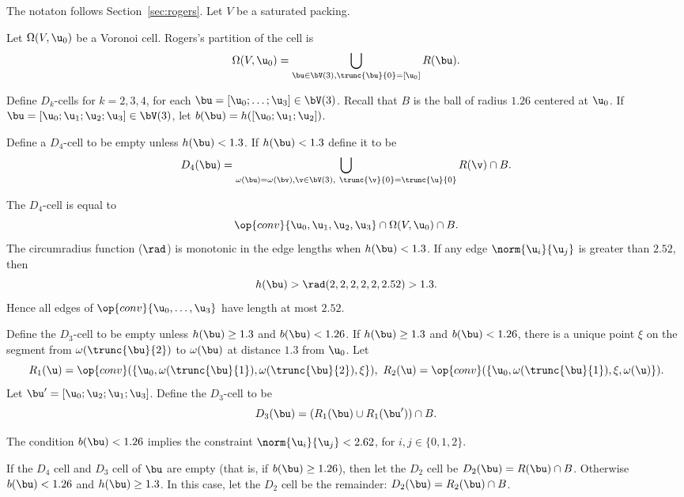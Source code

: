 The notaton follows Section~\ref{sec:rogers}.  Let $V$ be a saturated
packing.

Let $\Omega( V,\u_0)$ be a Voronoi cell.  Rogers's partition of the cell
is
\[
\Omega(V, \u_0) = \bigcup_{ \bu\in  \bV(3), \trunc{\bu}{0}= [\u_0] } R( \bu).
\]
%
%


Define $D_k$-cells for $k=2,3,4$, for each $ \bu=[\u_0;\ldots;\u_3]\in
\bV(3)$.  Recall that $B$ is the ball of radius $1.26$ centered at $
\u_0$.  If $\bu =[\u_0;\u_1;\u_2;\u_3]\in \bV(3)$, let $b(\bu) = h([
\u_0; \u_1; \u_2])$.  %
%

\begin{definition}[$D_4$]
  Define a $D_4$-cell to be empty unless $h(\bu)<1.3$.  If
  $h(\bu)<1.3$ define it to be
\[
  D_4(\bu)=\bigcup_{\omega( \bu)
=\omega(\bv),  \v\in  \bV(3),\ \trunc{\v}{0}= \trunc{\u}{0}}  R(\v)\cap B.
\]
%
\end{definition}

The $D_4$-cell is equal to
\[
  \op{conv}\{ \u_0, \u_1, \u_2, \u_3\} \cap \Omega(V, \u_0)\cap B.
\]
The circumradius function ($\rad$) is monotonic in the edge lengths
when $h(\bu)<1.3$.  If any edge $\norm{ \u_i}{ \u_j}$ is greater than
$2.52$, then
\[
h(\bu) > \rad(2,2,2,2,2,2.52) > 1.3.
\]  
Hence all edges of $\op{conv}\{\u_0,\ldots,\u_3\}$ have length at most
$2.52$.

\begin{definition}[$D_3$]
  Define the $D_3$-cell to be empty unless $h(\bu)\ge 1.3$ and
  $b(\bu)< 1.26$.  If $h(\bu) \ge 1.3$ and $b(\bu)< 1.26$, there is a
  unique point $\xi$ on the segment from $\omega( \trunc{\bu}{2})$ to
  $\omega(\bu)$ at distance $1.3$ from $ \u_0$.  Let
\[
  R_1( \u) = \op{conv}(\{ \u_0,\omega( \trunc{\bu}{1}),\omega( \trunc{\bu}{2}),\xi\} ),\ 
  R_2( \u) = \op{conv}(\{ \u_0,\omega( \trunc{\bu}{1}),\xi,\omega( \u)\} ).
\]
Let $ \bu' = [ \u_0; \u_2; \u_1; \u_3]$.
Define the $D_3$-cell to be
\[
D_3(\bu) = (R_1( \bu) \cup R_1( \bu'))\cap B.
\]
\end{definition}

The condition $b(\bu)< 1.26$ implies the constraint $\norm{ \u_i}{
  \u_j}< 2.62$, for $i,j\in\{0,1,2\}$.

\begin{definition}[$D_2$]
  If the $D_4$ cell and $D_3$ cell of $\bu$ are empty (that is, if
  $b(\bu)\ge 1.26$), then let the $D_2$ cell be $D_2(\bu)=R(\bu)\cap
  B$.  Otherwise $b(\bu)< 1.26$ and $h(\bu) \ge 1.3$.  In this case,
  let the $D_2$ cell be the remainder: $D_2(\bu)=R_2(\bu)\cap B$.
\end{definition}


